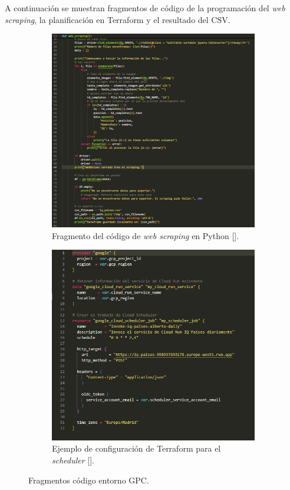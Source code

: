A continuación se muestran fragmentos de código de la programación del \textit{web scraping}, la planificación en Terraform y el resultado del CSV. 
\begin{figure}[H]
\centering
\begin{subfigure}[b]{0.48\textwidth}
\centering
\includegraphics[width=\textwidth]{figuras/captura_webscraping.png}
\caption{Fragmento del código de \textit{web scraping} en Python [].}
\label{webscraping}
\end{subfigure}
\hfill
\begin{subfigure}[b]{0.49\textwidth}
\centering
\includegraphics[width=\textwidth]{figuras/captura_terraform.png}
\caption{Ejemplo de configuración de Terraform para el \textit{scheduler} [].}
\label{terraform}
\end{subfigure}
\caption{Fragmentos código entorno GPC.}
\label{TerraformWebScraping}
\end{figure}
